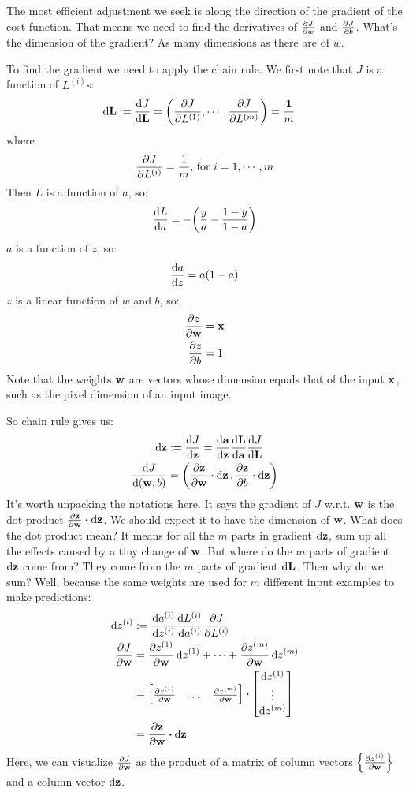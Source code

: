 \documentclass[11pt]{article}
\begin{document}
The most efficient adjustment we seek is along the direction of the gradient of the cost function.  That means we need to find the derivatives of $\pdv{J}{w}$ and $\pdv{J}{b}$.   What's the dimension of the gradient?  As many dimensions as there are of $w$. 

To find the gradient we need to apply the chain rule.  We first note that $J$ is a function of $L^{(i)}$s:
\begin{align*}
	\dd{\vb{L}} := \dv{J}{\vb{L}} &= \qty(\pdv{J}{L^{(1)}}, \cdots, \pdv{J}{L^{(m)}}) = \frac{\vb{1}}{m}
\end{align*}
where 
$$
	\pdv{J}{L^{(i)}} = \frac{1}{m} \text{, for } i = 1, \cdots, m
$$
Then $L$ is a function of $a$, so:
\begin{align*}
	\dv{L}{a} = - \qty(\frac{y}{a} - \frac{1 - y}{1 - a})
\end{align*}
$a$ is a function of $z$, so:
\begin{align*}
	\dv{a}{z} = a(1 - a)
\end{align*}
$z$ is a linear function of $w$ and $b$, so:
\begin{align*}
	\pdv{z}{\vb{w}} &= \vb{x} \\
	\pdv{z}{b} &= 1
\end{align*}
Note that the weights $\vb{w}$ are vectors whose dimension equals that of the input $\vb{x}$, such as the pixel dimension of an input image.

So chain rule gives us:
\begin{align*}
	\dd{\vb{z}} &:= \dv{J}{\vb{z}} = \dv{\vb{a}}{\vb{z}} \dv{\vb{L}}{\vb{a}} \dv{J}{\vb{L}} \\
	\dv{J}{\qty(\vb{w}, b)} &= \qty(\pdv{\vb{z}}{\vb{w}} \vdot \dd{\vb{z}}, \pdv{\vb{z}}{b} \vdot \dd{\vb{z}})
\end{align*}
It's worth unpacking the notations here.  It says the gradient of $J$ w.r.t. $\vb{w}$ is the dot product $\pdv{\vb{z}}{\vb{w}} \vdot \dd{\vb{z}}$.  We should expect it to have the dimension of $\vb{w}$.  What does the dot product mean?  It means for all the $m$ parts in gradient $\dd{\vb{z}}$, sum up all the effects caused by a tiny change of $\vb{w}$.  But where do the $m$ parts of gradient $\dd{\vb{z}}$ come from?  They come from the $m$ parts of gradient $\dd{\vb{L}}$.  Then why do we sum?  Well, because the same weights are used for $m$ different input examples to make predictions:
\begin{align*}
	\dd{z^{(i)}} &:= \dv{a^{(i)}}{z^{(i)}}\dv{L^{(i)}}{a^{(i)}}\pdv{J}{L^{(i)}} \\
	\pdv{J}{\vb{w}} &= \pdv{z^{(1)}}{\vb{w}}\dd{z^{(1)}} + \cdots +  \pdv{z^{(m)}}{\vb{w}}\dd{z^{(m)}} \\
		&= \mqty[\pdv{z^{(1)}}{\vb{w}} & \dots & \pdv{z^{(m)}}{\vb{w}}] \vdot \mqty[\dd{z^{(1)}} \\ \vdots \\ \dd{z^{(m)}}] \\
		&= \pdv{\vb{z}}{\vb{w}} \vdot \dd{\vb{z}}
\end{align*}
Here, we can visualize $\pdv{J}{\vb{w}}$ as the product of a matrix of column vectors $\qty{\pdv{z^{(i)}}{\vb{w}}}$ and a column vector $\dd{\vb{z}}$.
\end{document}
